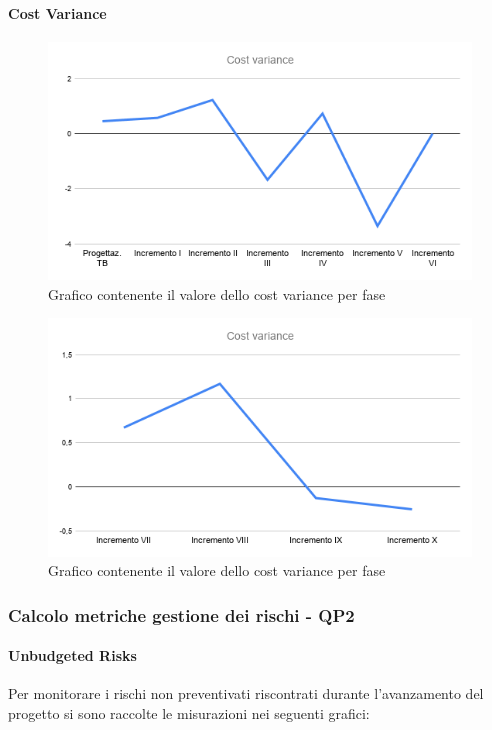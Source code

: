 	\paragraph{Cost Variance}
		\begin{figure}[H]
			\centering
			\includegraphics[width=0.8\linewidth]{./res/images/CV_1.png}
			\caption{Grafico contenente il valore dello cost variance per fase}
			\label{fig:Grafico contenente il valore dello cost variance per fase}
		\end{figure}
		\begin{figure}[H]
			\centering
			\includegraphics[width=0.8\linewidth]{./res/images/CV_2.png}
			\caption{Grafico contenente il valore dello cost variance per fase}
			\label{fig:Grafico contenente il valore dello cost variance per fase}
		\end{figure}

\subsubsection{Calcolo metriche gestione dei rischi - QP2}

\paragraph{Unbudgeted Risks}
Per monitorare i rischi non preventivati riscontrati durante l'avanzamento del progetto si sono raccolte le misurazioni nei seguenti grafici:

